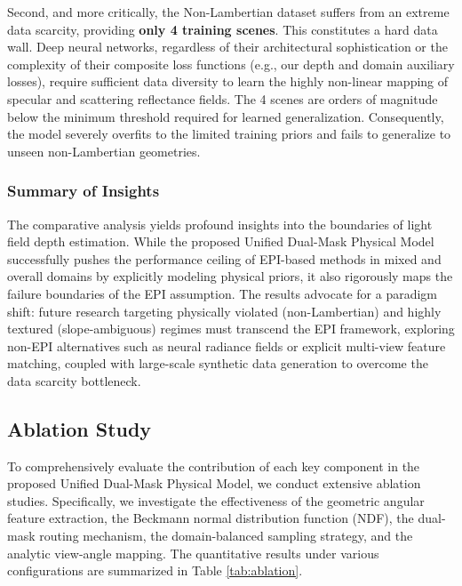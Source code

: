 \documentclass[lettersize,journal]{IEEEtran}
\begin{document}
Second, and more critically, the Non-Lambertian dataset suffers from an extreme data scarcity, providing \textbf{only 4 training scenes}. This constitutes a hard data wall. Deep neural networks, regardless of their architectural sophistication or the complexity of their composite loss functions (e.g., our depth and domain auxiliary losses), require sufficient data diversity to learn the highly non-linear mapping of specular and scattering reflectance fields. The 4 scenes are orders of magnitude below the minimum threshold required for learned generalization. Consequently, the model severely overfits to the limited training priors and fails to generalize to unseen non-Lambertian geometries. 

\subsubsection{Summary of Insights}
The comparative analysis yields profound insights into the boundaries of light field depth estimation. While the proposed Unified Dual-Mask Physical Model successfully pushes the performance ceiling of EPI-based methods in mixed and overall domains by explicitly modeling physical priors, it also rigorously maps the failure boundaries of the EPI assumption. The results advocate for a paradigm shift: future research targeting physically violated (non-Lambertian) and highly textured (slope-ambiguous) regimes must transcend the EPI framework, exploring non-EPI alternatives such as neural radiance fields or explicit multi-view feature matching, coupled with large-scale synthetic data generation to overcome the data scarcity bottleneck.

\subsection{Ablation Study}

To comprehensively evaluate the contribution of each key component in the proposed Unified Dual-Mask Physical Model, we conduct extensive ablation studies. Specifically, we investigate the effectiveness of the geometric angular feature extraction, the Beckmann normal distribution function (NDF), the dual-mask routing mechanism, the domain-balanced sampling strategy, and the analytic view-angle mapping. The quantitative results under various configurations are summarized in Table \ref{tab:ablation}.
\end{document}

